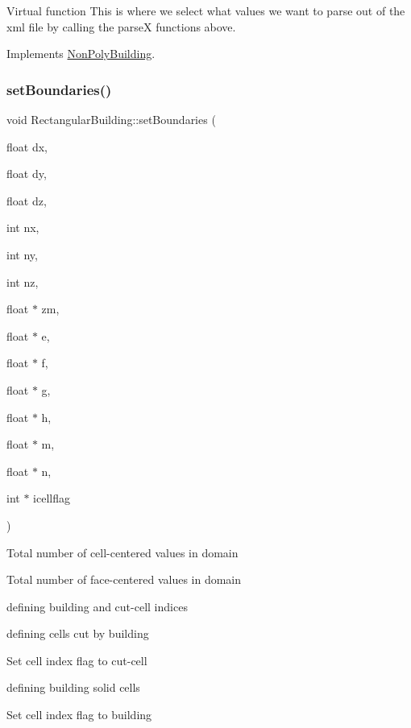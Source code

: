 Virtual function This is where we select what values we want to parse out of the xml file by calling the parseX functions above. 

Implements \hyperlink{classNonPolyBuilding_ace133756e0233d75b434fec5273b4414}{Non\+Poly\+Building}.

\mbox{\label{classRectangularBuilding_af690323c42b943b9a72ce6857b5e9ca0}} 
\subsubsection{\texorpdfstring{set\+Boundaries()}{setBoundaries()}}
{\footnotesize\ttfamily void Rectangular\+Building\+::set\+Boundaries (\begin{DoxyParamCaption}\item[{float}]{dx,  }\item[{float}]{dy,  }\item[{float}]{dz,  }\item[{int}]{nx,  }\item[{int}]{ny,  }\item[{int}]{nz,  }\item[{float $\ast$}]{zm,  }\item[{float $\ast$}]{e,  }\item[{float $\ast$}]{f,  }\item[{float $\ast$}]{g,  }\item[{float $\ast$}]{h,  }\item[{float $\ast$}]{m,  }\item[{float $\ast$}]{n,  }\item[{int $\ast$}]{icellflag }\end{DoxyParamCaption})\hspace{0.3cm}{\ttfamily [inline]}}

Total number of cell-\/centered values in domain

Total number of face-\/centered values in domain

defining building and cut-\/cell indices

defining cells cut by building

Set cell index flag to cut-\/cell

defining building solid cells

Set cell index flag to building

